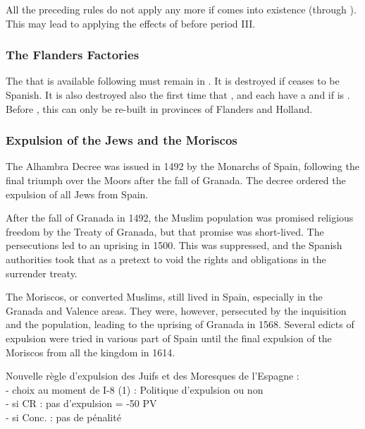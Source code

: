\aparag All the preceding rules do not apply any more if
 comes into existence (through
). This may lead to applying
the effects of  before period III.


\subsubsection{The Flanders Factories}\label{chSpecific:Spain:Cloth}
\aparag The  \MNU that is available following
 must remain in
. It is destroyed if  ceases
to be Spanish.
\bparag It is also destroyed also the first time that \ENG, \HOL and
\FRA each have a  \MNU and if \SPA is
.
\bparag Before , this  \MNU can only
be re-built in provinces of Flanders and Holland.


\subsubsection{Expulsion of the Jews and the Moriscos}
\label{chSpecific:Spain:Expulsion}
\begin{histoire}
  The Alhambra Decree was issued in 1492 by the Monarchs of Spain,
  following the final triumph over the Moors after the fall of
  Granada. The decree ordered the expulsion of all Jews from Spain.

  After the fall of Granada in 1492, the Muslim population was promised
  religious freedom by the Treaty of Granada, but that promise was
  short-lived. The persecutions led to an uprising in 1500. This was
  suppressed, and the Spanish authorities took that as a pretext to void
  the rights and obligations in the surrender treaty.

  The Moriscos, or converted Muslims, still lived in Spain, especially
  in the Granada and Valence areas. They were, however, persecuted by
  the inquisition and the population, leading to the uprising of Granada
  in 1568. Several edicts of expulsion were tried in various part of
  Spain until the final expulsion of the Moriscos from all the kingdom
  in 1614.
\end{histoire}

\aparag  Nouvelle règle d'expulsion des Juifs et des Moresques de l'Espagne : \\
- choix au moment de I-8 (1) : Politique d'expulsion ou non \\
- si CR : pas d'expulsion = -50 PV \\
- si Conc. : pas de pénalité \\

